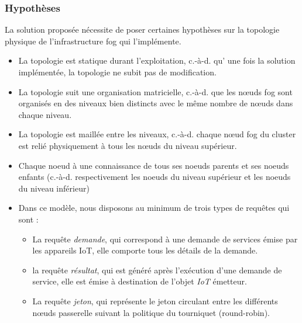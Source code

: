 \subsubsection{Hypothèses}
La solution proposée nécessite de poser certaines hypothèses sur la topologie physique de l’infrastructure fog qui l’implémente.\\
\begin{itemize}
    \item La topologie est statique durant l’exploitation, c.-à-d. qu' une fois la solution implémentée, la topologie ne subit pas de modification.
    \item La topologie suit une organisation matricielle, c.-à-d. que les nœuds fog sont organisés en des niveaux bien distincts avec le même nombre de nœuds dans chaque niveau.
    \item La topologie est maillée entre les niveaux, c.-à-d. chaque nœud fog du cluster est relié physiquement à tous les nœuds du niveau supérieur.
    \item Chaque noeud à une connaissance de tous ses noeuds parents et ses noeuds enfants (c.-à-d. respectivement les noeuds du niveau supérieur et les noeuds du niveau inférieur)
    \item Dans ce modèle, nous disposons au minimum de trois types de requêtes qui sont : \\
          \begin{itemize}
             \item La requête \emph{demande}, qui correspond à une demande de services émise par les appareils IoT, elle comporte tous les détails de la demande.
             \item la requête \emph{résultat}, qui est généré après l’exécution d’une demande de service, elle est émise à destination de l'objet \emph{IoT} émetteur.
             \item La requête \emph{jeton}, qui représente le jeton circulant entre les différents nœuds passerelle suivant la politique du tourniquet (round-robin).
          \end{itemize}
\end{itemize}
